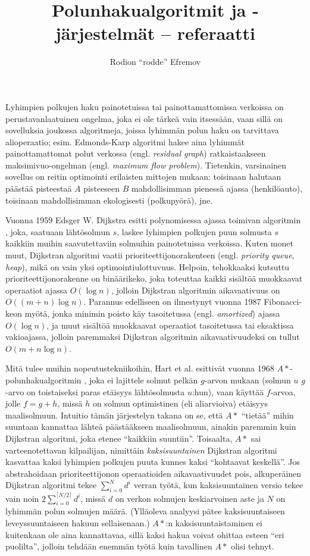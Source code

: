 \documentclass[12pt]{article}
\title{Polunhakualgoritmit ja -järjestelmät -- referaatti}
\author{Rodion ``rodde'' Efremov}
\begin{document}
 \maketitle
\noindent Lyhimpien polkujen haku painotetuissa tai painottamattomissa verkoissa on perustavanlaatuinen ongelma, joka ei ole tärkeä vain itsessään, vaan sillä on sovelluksia joukossa algoritmeja, joissa lyhimmän polun haku on tarvittava alioperaatio; esim. Edmonds-Karp algoritmi hakee aina lyhimmät painottamattomat polut verkossa (engl. \textit{residual graph}) ratkaistaakseen maksimivuo-ongelman (engl. \textit{maximum flow problem}). Tietenkin, varsinainen sovellus on reitin optimointi erilaisten mittojen mukaan: toisinaan halutaan päästää pisteestaä $A$ pisteeseen $B$ mahdollisimman pienessä ajassa (henkilöauto), toisinaan mahdollisimman ekologisesti (polkupyörä), jne.

Vuonna 1959 Edsger W. Dijkstra esitti polynomisessa ajassa toimivan algoritmin \cite{Dijkstra59}, joka, saatuaan lähtösolmun $s$, laskee lyhimpien polkujen puun solmusta $s$ kaikkiin muihin saavutettaviin solmuihin painotetuissa verkoissa. Kuten monet muut, Dijkstran algoritmi vaatii prioriteettijonorakenteen (engl. \textit{priority queue}, \textit{heap}), mikä on vain yksi optimointiulottuvuus. Helpoin, tehokkaaksi kutsuttu prioriteettijonorakenne on binäärikeko, joka toteuttaa kaikki sisältöä muokkaavat operaatiot ajassa $O(\log n)$, jolloin Dijkstran algoritmin aikavaativuus on $O((m + n) \log n)$. Parannus edelliseen on ilmestynyt vuonna 1987 Fibonacci-keon myötä, jonka minimin poisto käy tasoitetussa (engl. \textit{amortized}) ajassa $O(\log n)$, ja muut sisältöä muokkaavat operaatiot tasoitetussa tai eksaktissa vakioajassa, jolloin paremmaksi Dijkstran algoritmin aikavaativuudeksi on tullut $O(m + n\log n)$. 

Mitä tulee muihin nopeutustekniikoihin, Hart et al. esittivät vuonna 1968 $A\ast$-polun\-hakualgoritmin \cite{Hart68}, joka ei lajittele solmut pelkän $g$-arvon mukaan (solmun $u$ $g$-arvo on toistaiseksi paras etäisyys lähtösolmusta $u$:hun), vaan käyttää $f$-arvoa, jolle $f = g + h$, missä $h$ on solmun optimistinen (eli aliarvioiva) etäisyys maalisolmuun. Intuitio tämän järjestelyn takana on se, että $A\ast$ ``tietää'' mihin suuntaan kannattaa lähteä päästääkseen maalisolmuun, ainakin paremmin kuin Dijkstran algoritmi, joka etenee ``kaikkiin suuntiin''. Toisaalta, $A\ast$ sai varteenotettavan kilpailijan, nimittäin \textit{kaksisuuntainen} Dijkstran algoritmi kasvattaa kaksi lyhimpien polkujen puuta kunnes kaksi ``kohtaavat keskellä''. Jos abstrahoidaan prioriteettijonon operaatioiden aikavaativuudet pois, alkuperäinen Dijkstran algoritmi tekee $\sum_{i = 0}^N d^i$ verran työtä, kun kaksisuuntainen versio tekee vain noin $2\sum_{i=0}^{\lceil N / 2 \rceil}d^i$, missä $d$ on verkon solmujen keskiarvoinen aste ja $N$ on lyhimmän polun solmujen määrä. (Ylläoleva analyysi pätee kaksisuuntaiseen leveyssuuntaiseen hakuun sellaisenaan.) $A\ast$:n kaksisuuntaistaminen ei kuitenkaan ole aina kannattavaa, sillä kaksi hakua voivat ohittaa esteen ``eri puolilta'', jolloin tehdään enemmän työtä kuin tavallinen $A\ast$ olisi tehnyt.
\end{document}
